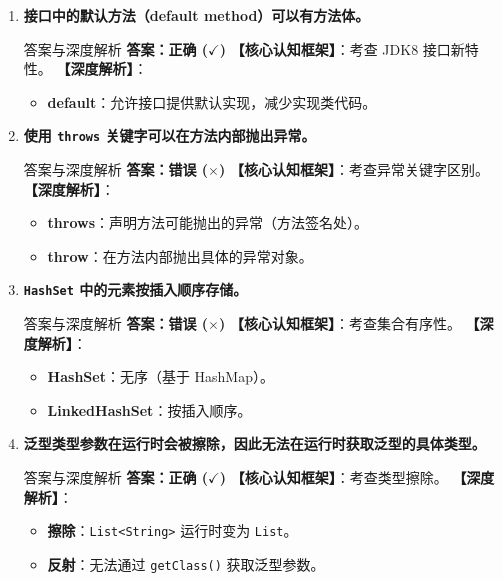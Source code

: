 \documentclass[12pt, a4paper]{ctexart}
\newcommand{\code}[1]{\texttt{#1}}
\begin{document}
\begin{enumerate}[label=\textbf{\arabic*.}, leftmargin=*, itemsep=1.5em]
\item \textbf{接口中的默认方法（default method）可以有方法体。}
\begin{bluebox}{答案与深度解析}
\textbf{答案：正确 ($\checkmark$)}
\textbf{【核心认知框架】}：考查 JDK8 接口新特性。
\textbf{【深度解析】}：
\begin{itemize}[leftmargin=*, nosep]
    \item \textbf{default}：允许接口提供默认实现，减少实现类代码。
\end{itemize}
\end{bluebox}

\item \textbf{使用 \code{throws} 关键字可以在方法内部抛出异常。}
\begin{bluebox}{答案与深度解析}
\textbf{答案：错误 ($\times$)}
\textbf{【核心认知框架】}：考查异常关键字区别。
\textbf{【深度解析】}：
\begin{itemize}[leftmargin=*, nosep]
    \item \textbf{throws}：声明方法可能抛出的异常（方法签名处）。
    \item \textbf{throw}：在方法内部抛出具体的异常对象。
\end{itemize}
\end{bluebox}

\item \textbf{\code{HashSet} 中的元素按插入顺序存储。}
\begin{bluebox}{答案与深度解析}
\textbf{答案：错误 ($\times$)}
\textbf{【核心认知框架】}：考查集合有序性。
\textbf{【深度解析】}：
\begin{itemize}[leftmargin=*, nosep]
    \item \textbf{HashSet}：无序（基于 HashMap）。
    \item \textbf{LinkedHashSet}：按插入顺序。
\end{itemize}
\end{bluebox}

\item \textbf{泛型类型参数在运行时会被擦除，因此无法在运行时获取泛型的具体类型。}
\begin{bluebox}{答案与深度解析}
\textbf{答案：正确 ($\checkmark$)}
\textbf{【核心认知框架】}：考查类型擦除。
\textbf{【深度解析】}：
\begin{itemize}[leftmargin=*, nosep]
    \item \textbf{擦除}：\code{List<String>} 运行时变为 \code{List}。
    \item \textbf{反射}：无法通过 \code{getClass()} 获取泛型参数。
\end{itemize}
\end{bluebox}


\end{enumerate}
\end{document}
